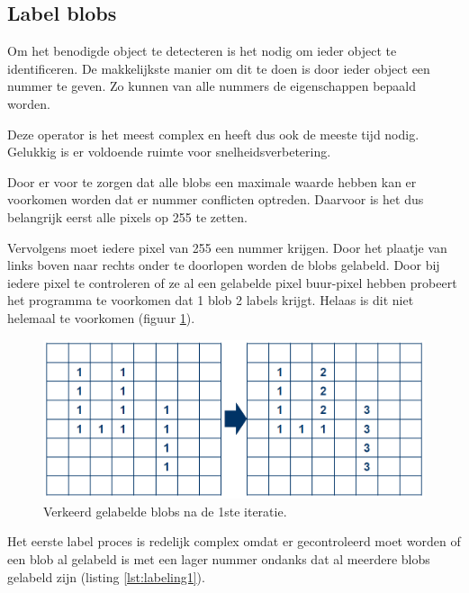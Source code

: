 \subsection{Label blobs}
\label{sec:labelblobs}

Om het benodigde object te detecteren is het nodig om ieder object te
identificeren. De makkelijkste manier om dit te doen is door ieder object een
nummer te geven. Zo kunnen van alle nummers de eigenschappen bepaald worden.

Deze operator is het meest complex en heeft dus ook de meeste tijd nodig.
Gelukkig is er voldoende ruimte voor snelheidsverbetering.

Door er voor te zorgen dat alle blobs een maximale waarde hebben kan er voorkomen
worden dat er nummer conflicten optreden. Daarvoor is het dus belangrijk eerst
alle pixels op 255 te zetten.

Vervolgens moet iedere pixel van 255 een nummer krijgen. Door het plaatje van
links boven naar rechts onder te doorlopen worden de blobs gelabeld. Door bij
iedere pixel te controleren of ze al een gelabelde pixel buur-pixel hebben
probeert het programma te voorkomen dat 1 blob 2 labels krijgt. Helaas is dit
niet helemaal te voorkomen (figuur \ref{fig:lbstep1}).

\begin{figure}
    \begin{center}
        \includegraphics[scale=0.4]{figures/label_blobs_step1.png}
    \end{center}
    \caption{Verkeerd gelabelde blobs na de 1ste iteratie.}
    \label{fig:lbstep1}
\end{figure}

Het eerste label proces is redelijk complex omdat er gecontroleerd moet worden
of een blob al gelabeld is met een lager nummer ondanks dat al meerdere blobs gelabeld
zijn (listing \ref{lst:labeling1}).

